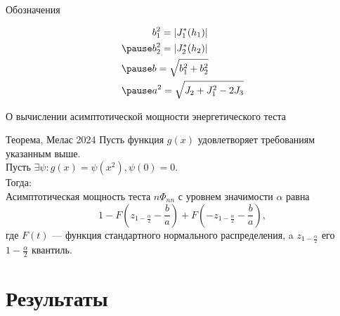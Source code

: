 \documentclass[12pt]{beamer}
\begin{document}
\begin{frame}{Обозначения}
	
	\begin{align*}
		&b^2_1 = | J^*_1(h_1) |\\
		\pause
		&b^2_2 = | J^*_2(h_2) |\\
		\pause
		&b = \sqrt{b^2_1 + b^2_2} \\
		\pause
		&a^2 = \sqrt{ J_2 + J^2_1 - 2J_3}
	\end{align*}
	
\end{frame}

\begin{frame}{О вычислении асимптотической мощности энергетического теста}
	\begin{block}{Теорема, Мелас 2024}
		Пусть функция $g(x)$ удовлетворяет требованиям указанным выше.\\
		\pause
		Пусть $\exists \psi: g(x) = \psi(x^2), \psi(0) = 0 $.\\
		\pause
		Тогда:\\
		Асимптотическая мощность теста $n\Phi_{nn}$ с уровнем значимости $\alpha$ равна
		\[ 
		1 - F \left(z_{1-\frac{\alpha}{2}} - \frac{b}{a} \right) + F \left(-z_{1-\frac{\alpha}{2}} - \frac{b}{a} \right),
		\]
		\pause
		где $F(t)$ --- функция стандартного нормального распределения, a $z_{1-\frac{\alpha}{2}}$ его $1-\frac{\alpha}{2}$ квантиль.
	\end{block}
\end{frame}




\section{Результаты}
\end{document}
